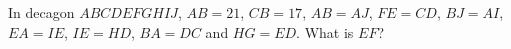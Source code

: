 In decagon $ABCDEFGHIJ$, $AB=21$, $CB=17$, $AB=AJ$, $FE=CD$, $BJ=AI$, $EA=IE$, $IE=HD$, $BA=DC$ and $HG=ED$. What is $EF$?

